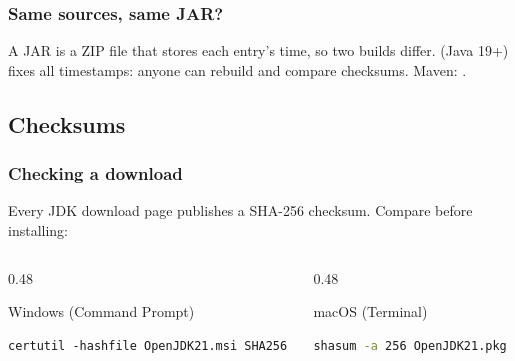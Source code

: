 \documentclass[aspectratio=169,10pt,compress]{beamer}
\begin{document}
\begin{frame}[t,fragile] \frametitle{Same sources, same JAR? }

  \vspace{0.1em}
  \small
  A JAR is a ZIP file that stores each entry's time, so two builds differ.  (Java 19+) fixes all
  timestamps: anyone can rebuild and compare checksums. Maven: .
\end{frame}

\subsection[Checksums]{Checksums}




\begin{frame}[t,fragile] \frametitle{Checking a download}
  \vspace{0.2em}
  Every JDK download page publishes a SHA-256 checksum. Compare before installing:
  \begin{columns}[T]
    \begin{column}{0.48\textwidth}
      \begin{block}{Windows (Command Prompt)}


\begin{lstlisting}[style=codesnippet, language={}, basicstyle=\ttfamily\scriptsize]
certutil -hashfile OpenJDK21.msi SHA256
\end{lstlisting}


      \end{block}
    \end{column}
    \begin{column}{0.48\textwidth}
      \begin{block}{macOS (Terminal)}


\begin{lstlisting}[style=codesnippet, language=bash, basicstyle=\ttfamily\scriptsize]
shasum -a 256 OpenJDK21.pkg
\end{lstlisting}


      \end{block}
    \end{column}
  \end{columns}
\end{frame}
\end{document}
